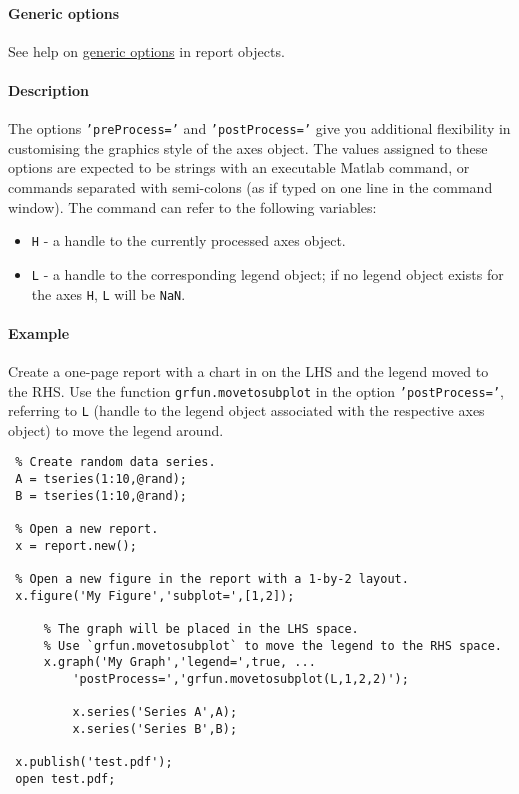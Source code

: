  \paragraph{Generic options}
 
 See help on \href{report/Contents}{generic options} in report objects.
 
 \paragraph{Description}
 
 The options \texttt{'preProcess='} and \texttt{'postProcess='} give you
 additional flexibility in customising the graphics style of the axes
 object. The values assigned to these options are expected to be strings
 with an executable Matlab command, or commands separated with
 semi-colons (as if typed on one line in the command window). The command
 can refer to the following variables:
 
 \begin{itemize}
 \item
   \texttt{H} - a handle to the currently processed axes object.
 \item
   \texttt{L} - a handle to the corresponding legend object; if no legend
   object exists for the axes \texttt{H}, \texttt{L} will be
   \texttt{NaN}.
 \end{itemize}
 
 \paragraph{Example}
 
 Create a one-page report with a chart in on the LHS and the legend moved
 to the RHS. Use the function \texttt{grfun.movetosubplot} in the option
 \texttt{'postProcess='}, referring to \texttt{L} (handle to the legend
 object associated with the respective axes object) to move the legend
 around.
 
 \begin{verbatim}
 % Create random data series.
 A = tseries(1:10,@rand);
 B = tseries(1:10,@rand);
 
 % Open a new report.
 x = report.new();
 
 % Open a new figure in the report with a 1-by-2 layout.
 x.figure('My Figure','subplot=',[1,2]);
 
     % The graph will be placed in the LHS space.
     % Use `grfun.movetosubplot` to move the legend to the RHS space.
     x.graph('My Graph','legend=',true, ...
         'postProcess=','grfun.movetosubplot(L,1,2,2)');
 
         x.series('Series A',A);
         x.series('Series B',B);
 
 x.publish('test.pdf');
 open test.pdf;
 \end{verbatim}


